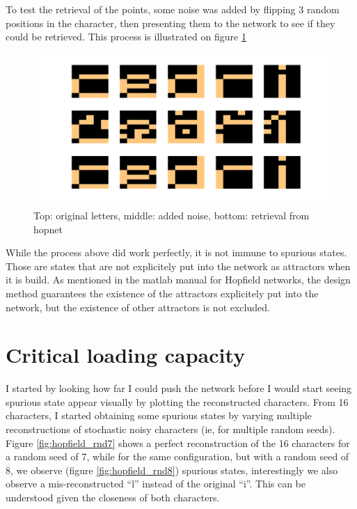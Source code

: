 \documentclass[11pt, a4paper]{article}
\begin{document}
To test the retrieval of the points, some noise was added by flipping 3 random positions in the character, then presenting them to the network to see if they could be retrieved. This process is illustrated on figure \ref{fig:hopfield_chargen}

\begin{figure}[H]
  \centering
  \includegraphics[scale=.30]{hopfield_denoising.png}
  \caption{Top: original letters, middle: added noise, bottom:
    retrieval from hopnet}
  \label{fig:hopfield_chargen}
\end{figure}

While the process above did work perfectly, it is not immune to
spurious states. Those are states that are not explicitely put into
the network as attractors when it is build. As mentioned in the matlab
manual for Hopfield networks, the design method guarantees the
existence of the attractors explicitely put into the network, but the
existence of other attractors is not excluded.

\section{Critical loading capacity}

I started by looking how far I could push the network before I would
start seeing spurious state appear visually by plotting the
reconstructed characters. From 16 characters, I started obtaining some
spurious states by varying multiple reconstructions of stochastic
noisy characters (ie, for multiple random seeds). Figure
\ref{fig:hopfield_rnd7} shows a perfect reconstruction of the 16
characters for a random seed of 7, while for the same configuration,
but with a random seed of 8, we observe (figure
\ref{fig:hopfield_rnd8}) spurious states, interestingly we also
observe a mis-reconstructed ``l'' instead of the original ``i''. This
can be understood given the closeness of both characters.
\end{document}
